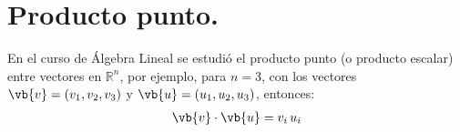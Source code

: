 

\section{Producto punto.}

En el curso de Álgebra Lineal se estudió el producto punto (o producto escalar) entre vectores en $\mathbb{R}^{n}$, por ejemplo, para $n = 3$, con los vectores $\vb{v} = (v_{1}, v_{2}, v_{3})$ y $\vb{u} = (u_{1}, u_{2}, u_{3})$, entonces:
\begin{align*}
\vb{v} \cdot \vb{u} = v_{i} \, u_{i}
\end{align*}

